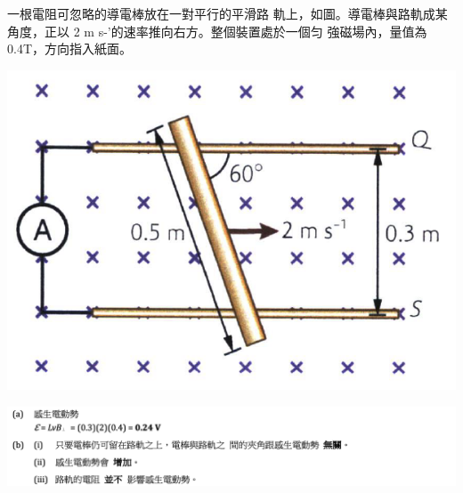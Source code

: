 {
    一根電阻可忽略的導電棒放在一對平行的平滑路 軌上，如圖。導電棒與路軌成某角度，正以 2 m s-'的速率推向右方。整個裝置處於一個匀 強磁場內，量值為0.4T，方向指入紙面。
    \par{\par\centering\includegraphics[width=.35\textwidth]{./img/ch5_induction_lq_2024-06-24-17-15-08.png}\par}
}{\par{\par\centering\includegraphics[width=\textwidth]{./img/ch5_induction_lq_2024-06-24-17-39-56.png}\par}}

